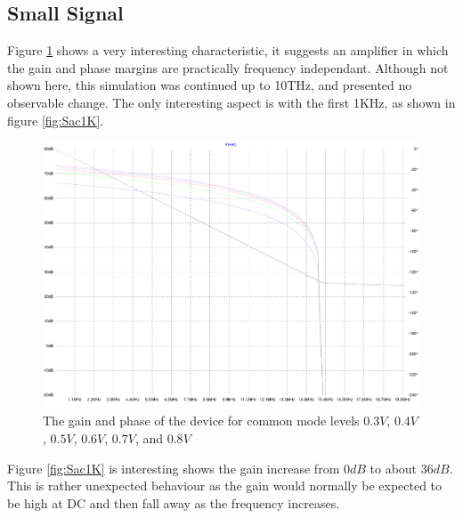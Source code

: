 \subsection{Small Signal}

Figure \ref{fig:Sac} shows a very interesting characteristic, it suggests an amplifier in which the gain and phase margins are practically frequency independant.
Although not shown here, this simulation was continued up to 10THz, and presented no observable change.
The only interesting aspect is with the first 1KHz, as shown in figure \ref{fig:Sac1K}.

\begin{figure}[H]
	\centering
	\includegraphics[width=\textwidth]{./images/BasicAC-multi.pdf}
	\caption{The gain and phase of the device for common mode levels $0.3V$, $0.4V$, $0.5V$, $0.6V$, $0.7V$, and $0.8V$}
	\label{fig:Sac}
\end{figure}

Figure \ref{fig:Sac1K} is interesting shows the gain increase from $0dB$ to about $36dB$.
This is rather unexpected behaviour as the gain would normally be expected to be high at DC and then fall away as the frequency increases.
